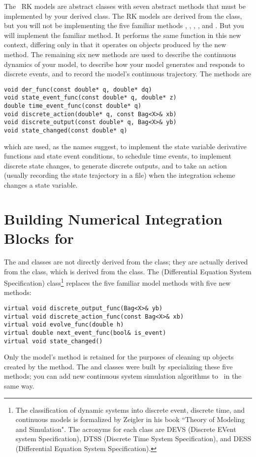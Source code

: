 The \adevs\ RK models are abstract classes with seven abstract methods that must be implemented by your derived class. The RK models are derived from the  class, but you will not be implementing the five familiar methods , , , , and . But you will implement the familiar  method. It performs the same function in this new context, differing only in that it operates on objects produced by the new  method. The remaining six new methods are used to describe the continuous dynamics of your model, to describe how your model generates and responds to discrete events, and to record the model's continuous trajectory. The methods are
\begin{verbatim}
void der_func(const double* q, double* dq)
void state_event_func(const double* q, double* z)
double time_event_func(const double* q)
void discrete_action(double* q, const Bag<X>& xb)
void discrete_output(const double* q, Bag<X>& yb)
void state_changed(const double* q)
\end{verbatim}
which are used, as the names suggest, to implement the state variable derivative functions and state event conditions, to schedule time events, to implement discrete state changes, to generate discrete outputs, and to take an action (usually recording the state trajectory in a file) when the integration scheme changes a state variable. 



\section{Building Numerical Integration Blocks for \adevs}
The  and  classes are not directly derived from the  class; they are actually derived from the  class, which is derived from the  class. The  (Differential Equation System Specification) class\footnote{The classification of dynamic systems into discrete event, discrete time, and continuous models is formalized by Zeigler in his book ``Theory of Modeling and Simulation". The acronyms for each class are DEVS (Discrete EVent system Specification), DTSS (Discrete Time System Specification), and DESS (Differential Equation System Specification).} replaces the five familiar  model methods with five new methods: 
\begin{verbatim}
virtual void discrete_output_func(Bag<X>& yb)
virtual void discrete_action_func(const Bag<X>& xb)
virtual void evolve_func(double h)
virtual double next_event_func(bool& is_event)
virtual void state_changed()
\end{verbatim}
Only the  model's  method is retained for the purposes of cleaning up objects created by the  method. The  and  classes were built by specializing these five methods; you can add new continuous system simulation algorithms to \adevs\ in the same way.

